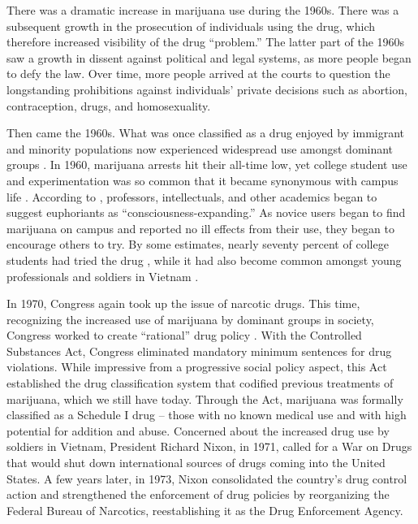 There was a dramatic increase in marijuana use during the 1960s. There was a subsequent growth in the prosecution of individuals using the drug, which therefore increased visibility of the drug ``problem.'' The latter part of the 1960s saw a growth in dissent against political and legal systems, as more people began to defy the law. Over time, more people arrived at the courts to question the longstanding prohibitions against individuals' private decisions such as abortion, contraception, drugs, and homosexuality. 




Then came the 1960s. What was once classified as a drug enjoyed by immigrant and minority populations now experienced widespread use amongst dominant groups \citep{becker_1963}. In 1960, marijuana arrests hit their all-time low, yet college student use and experimentation was so common that it became synonymous with campus life \citep{goldstein_1966}. According to \citet{goldstein_1966}, professors, intellectuals, and other academics began to suggest euphoriants as ``consciousness-expanding.''  As novice users began to find marijuana on campus and reported no ill effects from their use, they began to encourage others to try. By some estimates, nearly seventy percent of college students had tried the drug \citep{mosher_and_akins_2019}, while it had also become common amongst young professionals and soldiers in Vietnam \citep{bonnie_and_whitebread_1970}. 

In 1970, Congress again took up the issue of narcotic drugs. This time, recognizing the increased use of marijuana by dominant groups in society, Congress worked to create ``rational'' drug policy \citep{mosher_and_akins_2019}. With the Controlled Substances Act, Congress eliminated mandatory minimum sentences for drug violations. While impressive from a progressive social policy aspect, this Act established the drug classification system that codified previous treatments of marijuana, which we still have today. Through the Act, marijuana was formally classified as a Schedule I drug -- those with no known medical use and with high potential for addition and abuse. Concerned about the increased drug use by soldiers in Vietnam, President Richard Nixon, in 1971, called for a War on Drugs that would shut down international sources of drugs coming into the United States. A few years later, in 1973, Nixon consolidated the country's drug control action and strengthened the enforcement of drug policies by reorganizing the Federal Bureau of Narcotics, reestablishing it as the Drug Enforcement Agency. 


